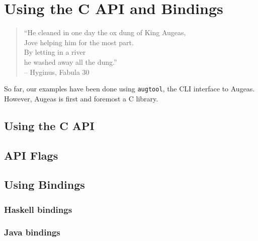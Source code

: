 \chapter{Using the C API and Bindings}

\label{chap:api}
 

\begin{verse}
  \begin{flushright}
    \begin{scriptsize}
``He cleaned in one day the ox dung of King Augeas, \\
Jove helping him for the most part. \\
By letting in a river \\
he washed away all the dung.''\\
\bigskip
\tiny{-- Hyginus, Fabula 30}
    \end{scriptsize}
  \end{flushright}
\end{verse}
\bigskip

So far, our examples have been done using \verb!augtool!, the CLI interface to Augeas. However, Augeas is first and foremost a C library.

\section{Using the C API}


\section{API Flags}

 

\section{Using Bindings}


\subsection{Haskell bindings}


\subsection{Java bindings}

